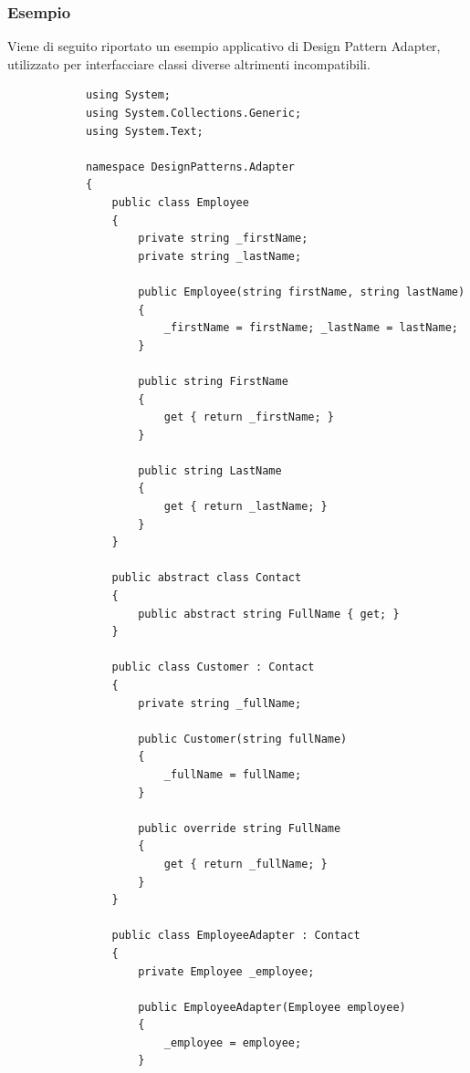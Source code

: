 \documentclass[a4paper,10pt]{article}
\begin{document}
    \subsubsection{Esempio}
    Viene di seguito riportato un esempio applicativo di Design Pattern Adapter, utilizzato per interfacciare classi diverse altrimenti incompatibili.

        \begin{lstlisting}
            using System;
            using System.Collections.Generic;
            using System.Text;
            
            namespace DesignPatterns.Adapter
            {
                public class Employee
                {
                    private string _firstName;
                    private string _lastName;
            
                    public Employee(string firstName, string lastName)
                    {
                        _firstName = firstName; _lastName = lastName;
                    }
            
                    public string FirstName
                    {
                        get { return _firstName; }
                    }
            
                    public string LastName
                    {
                        get { return _lastName; }
                    }
                }
            
                public abstract class Contact
                {
                    public abstract string FullName { get; }
                }
            
                public class Customer : Contact
                {
                    private string _fullName;
            
                    public Customer(string fullName)
                    {
                        _fullName = fullName;
                    }
            
                    public override string FullName
                    {
                        get { return _fullName; }
                    }
                }
            
                public class EmployeeAdapter : Contact
                {
                    private Employee _employee;
            
                    public EmployeeAdapter(Employee employee)
                    {
                        _employee = employee;
                    }


\end{lstlisting}
\end{document}
